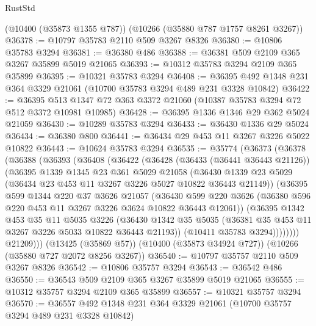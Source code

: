 \begin{lexlean}{RustStd}
\begin{coremodule}
    (@10400 (@35873 @1355 @787))
    (@10266 (@35880 @787 @1757 @8261 @3267))
@36378 := @10797 @35783 @2110 @509 @3267 @8326
@36380 := @10806 @35783 @3294
@36381 := @36380 @486
@36388 := @36381 @509 @2109 @365 @3267 @35899 @5019 @21065
@36393 := @10312 @35783 @3294 @2109 @365 @35899
@36395 := @10321 @35783 @3294
@36408 := @36395 @492 @1348 @231 @364 @3329 @21061 (@10700 @35783 @3294 @489 @231 @3328 @10842)
@36422 := @36395 @513 @1347 @72 @363 @3372 @21060 (@10387 @35783 @3294 @72 @512 @3372 @10981 @10985)
@36428 := @36395 @1336 @1346 @29 @362 @5024 @21059
@36430 := @10289 @35783 @3294
@36433 := @36430 @1336 @29 @5024
@36434 := @36380 @800
@36441 := @36434 @29 @453 @11 @3267 @3226 @5022 @10822
@36443 := @10624 @35783 @3294
@36535 := @35774
    (@36373
      (@36378
        (@36388
          (@36393
            (@36408
              (@36422
                (@36428
                  (@36433 (@36441 @36443 @21126))
                  (@36395
                    @1339
                    @1345
                    @23
                    @361
                    @5029
                    @21058
                    (@36430
                      @1339
                      @23
                      @5029
                      (@36434 @23 @453 @11 @3267 @3226 @5027 @10822 @36443 @21149))
                    (@36395
                      @599
                      @1344
                      @220
                      @37
                      @3626
                      @21057
                      (@36430
                        @599
                        @220
                        @3626
                        (@36380 @596 @220 @453 @11 @3267 @3226 @3624 @10822 @36443 @12061))
                      (@36395
                        @1342
                        @453
                        @35
                        @11
                        @5035
                        @3226
                        (@36430
                          @1342
                          @35
                          @5035
                          (@36381 @35 @453 @11 @3267 @3226 @5033 @10822 @36443 @21193))
                        (@10411 @35783 @3294))))))))
          @21209)))
    (@13425 (@35869 @57))
    (@10400 (@35873 @34924 @727))
    (@10266 (@35880 @727 @2072 @8256 @3267))
@36540 := @10797 @35757 @2110 @509 @3267 @8326
@36542 := @10806 @35757 @3294
@36543 := @36542 @486
@36550 := @36543 @509 @2109 @365 @3267 @35899 @5019 @21065
@36555 := @10312 @35757 @3294 @2109 @365 @35899
@36557 := @10321 @35757 @3294
@36570 := @36557 @492 @1348 @231 @364 @3329 @21061 (@10700 @35757 @3294 @489 @231 @3328 @10842)

\end{coremodule}
\end{lexlean}
